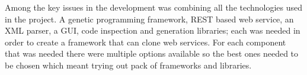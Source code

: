 Among the key issues in the development was combining all the technologies used in the project. A genetic programming framework, REST based
web service, an XML parser, a GUI, code inspection and generation libraries; each was needed in order to create a framework that can clone
web services. For each component that was needed there were multiple options available so the best ones needed to be chosen which meant
trying out pack of frameworks and libraries.